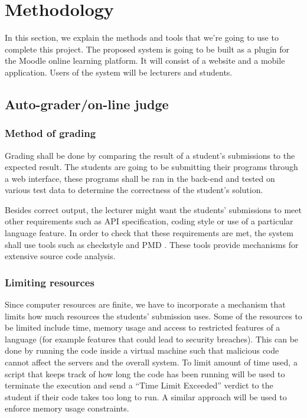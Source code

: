 \documentclass[12pt]{article}
\begin{document}
\newpage

\section{Methodology}
	In this section, we explain the methods and tools that we're going to use to complete this project. The proposed system is going to be built as a plugin for the Moodle online learning platform. It will consist of a website and a mobile application. Users of the system will be lecturers and students.
	\subsection{Auto-grader/on-line judge}
		\subsubsection{Method of grading}
		Grading shall be done by comparing the result of a student's submissions to the expected result. The students are going to be submitting their programs through a web interface, these programs shall be ran in the back-end and tested on various test data to determine the correctness of the student's solution. 
		
		Besides correct output, the lecturer might want the students' submissions to meet other requirements such as API specification, coding style or use of a particular language feature. In order to check that these requirements are met, the system shall use tools such as checkstyle \cite{checkstyle} and PMD \cite{pmd}. These tools provide mechanisms for extensive source code analysis.
		\subsubsection{Limiting resources}
		Since computer resources are finite, we have to incorporate a mechanism that limits how much resources the students' submission uses. Some of the resources to be limited include time, memory usage and access to restricted features of a language (for example features that could lead to security breaches). This can be done by running the code inside a virtual machine such that malicious code cannot affect the servers and the overall system. To limit amount of time used, a script that keeps track of how long the code has been running will be used to terminate the execution and send a “Time Limit Exceeded” verdict to the student if their code takes too long to run. A similar approach will be used to enforce memory usage constraints.
\end{document}
